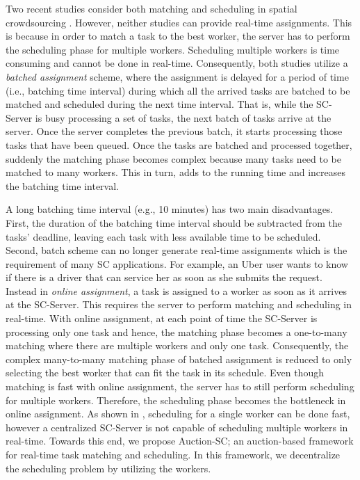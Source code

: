 Two recent studies consider both matching and scheduling in spatial crowdsourcing \cite{Deng15, Chen15}. However, neither studies can provide real-time assignments. This is because in order to match a task to the best worker, the server has to perform the scheduling phase for multiple workers. Scheduling multiple workers is time consuming and cannot be done in real-time. Consequently, both studies utilize a \textit{batched assignment} scheme, where the assignment is delayed for a period of time (i.e., batching time interval) during which all the arrived tasks are batched to be matched and scheduled during the next time interval. That is, while the SC-Server is busy processing a set of tasks, the next batch of tasks arrive at the server. Once the server completes the previous batch, it starts processing those tasks that have been queued. Once the tasks are batched and processed together, suddenly the matching phase becomes complex because many tasks need to be matched to many workers. This in turn, adds to the running time and increases the batching time interval.

A long batching time interval (e.g., 10 minutes) has two main disadvantages.  First, the duration of the batching time interval should be subtracted from the tasks' deadline, leaving each task with less available time to be scheduled. Second, batch scheme can no longer generate real-time assignments which is the requirement of many SC applications. For example, an Uber user wants to know if there is a driver that can service her as soon as she submits the request. Instead in \textit{online assignment}, a task is assigned to a worker as soon as it arrives at the SC-Server. This requires the server to perform matching and scheduling in real-time. With online assignment, at each point of time the SC-Server is processing only one task and hence, the matching phase becomes a one-to-many matching where there are multiple workers and only one task. Consequently, the complex many-to-many matching phase of batched assignment is reduced to only selecting the best worker that can fit the task in its schedule. Even though matching is fast with online assignment, the server has to still perform scheduling for multiple workers. Therefore, the scheduling phase becomes the bottleneck in online assignment. As shown in \cite{Li15}, scheduling for a single worker can be done fast, however a centralized SC-Server is not capable of scheduling multiple workers in real-time. Towards this end, we propose Auction-SC; an auction-based framework for real-time task matching and scheduling. In this framework, we decentralize the scheduling problem by utilizing the workers.

